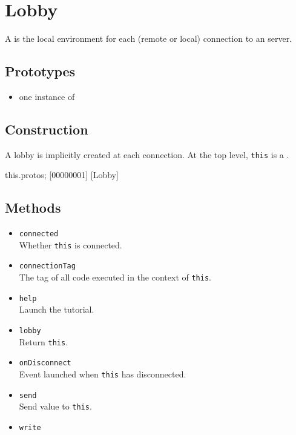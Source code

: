 \section{Lobby}

A  is the local environment for each (remote or local)
connection to an \urbi server.

\subsection{Prototypes}
\begin{itemize}
\item one instance of 
\end{itemize}

\subsection{Construction}

A lobby is implicitly created at each connection. At the top level,
\lstinline|this| is a .

\begin{urbiscript}
this.protos;
[00000001] [Lobby]
\end{urbiscript}

\subsection{Methods}
\begin{itemize}
\item \lstinline|connected|\\
  Whether \lstinline|this| is connected.

\item \lstinline|connectionTag|\\
  The tag of all code executed in the context of \lstinline|this|.

\item \lstinline|help|\\
  Launch the tutorial.

\item \lstinline|lobby|\\
  Return \lstinline|this|.

\item \lstinline|onDisconnect|\\
  Event launched when \lstinline|this| has disconnected.

\item \lstinline|send|\\
  Send value to \lstinline|this|.

\item \lstinline|write|\\
\end{itemize}

